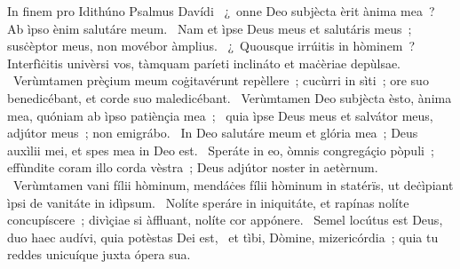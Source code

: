{ In finem pro Idithúno Psalmus Davídi}
{%
~¿~onne Deo subjècta èrit ànima mea~? Ab ìpso ènim salutáre meum. 
~Nam et ìpse Deus meus et salutáris meus~; susċèptor meus, non movébor àmplius. 
~¿~Quousque irrúitis in hòminem~? Interfìċitis univèrsi vos, tàmquam paríeti inclináto et maċèriae depùlsae. 
~Verùmtamen prèçium meum coġitavérunt repèllere~; cucùrri in sìti~; ore suo benedicébant, et corde suo maledicébant. 
~Verùmtamen Deo subjècta èsto, ànima mea, quóniam ab ìpso patiènçia mea~; 
~quia ìpse Deus meus et salvátor meus, adjútor meus~; non emigrábo. 
~In Deo salutáre meum et glória mea~; Deus auxìlii mei, et spes mea in Deo est. 
~Speráte in eo, òmnis congregáçio pòpuli~; effùndite coram illo corda vèstra~; Deus adjútor noster in aetèrnum. 
~Verùmtamen vani fílii hòminum, mendáċes fílii hòminum in statérïs, ut deċìpiant ìpsi de vanitáte in idìpsum. 
~Nolíte speráre in iniquitáte, et rapínas nolíte concupíscere~; divìçiae si àffluant, nolíte cor appónere. 
~Semel locútus est Deus, duo haec audívi, quia potèstas Dei est, 
~et tìbi, Dòmine, mizericórdia~; quia tu reddes unicuíque juxta ópera sua. 
}
